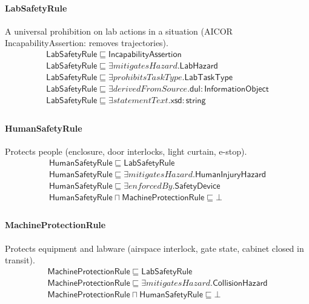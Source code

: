\documentclass[10pt]{article}
\begin{document}
\paragraph{LabSafetyRule} A universal prohibition on lab actions in a situation (AICOR IncapabilityAssertion: removes trajectories).
\[\begin{array}{l}
\mathsf{LabSafetyRule} \sqsubseteq  \mathsf{IncapabilityAssertion} \\
\mathsf{LabSafetyRule} \sqsubseteq  \exists \mathit{mitigatesHazard}.\mathsf{LabHazard} \\
\mathsf{LabSafetyRule} \sqsubseteq  \exists \mathit{prohibitsTaskType}.\mathsf{LabTaskType} \\
\mathsf{LabSafetyRule} \sqsubseteq  \exists \mathit{derivedFromSource}.\mathsf{dul{:}InformationObject} \\
\mathsf{LabSafetyRule} \sqsubseteq  \exists \mathit{statementText}.\mathsf{xsd{:}string} \\
\end{array}\]
\paragraph{HumanSafetyRule} Protects people (enclosure, door interlocks, light curtain, e-stop).
\[\begin{array}{l}
\mathsf{HumanSafetyRule} \sqsubseteq  \mathsf{LabSafetyRule} \\
\mathsf{HumanSafetyRule} \sqsubseteq  \exists \mathit{mitigatesHazard}.\mathsf{HumanInjuryHazard} \\
\mathsf{HumanSafetyRule} \sqsubseteq  \exists \mathit{enforcedBy}.\mathsf{SafetyDevice} \\
\mathsf{HumanSafetyRule} \sqcap  \mathsf{MachineProtectionRule} \sqsubseteq  \bot  \\
\end{array}\]
\paragraph{MachineProtectionRule} Protects equipment and labware (airspace interlock, gate state, cabinet closed in transit).
\[\begin{array}{l}
\mathsf{MachineProtectionRule} \sqsubseteq  \mathsf{LabSafetyRule} \\
\mathsf{MachineProtectionRule} \sqsubseteq  \exists \mathit{mitigatesHazard}.\mathsf{CollisionHazard} \\
\mathsf{MachineProtectionRule} \sqcap  \mathsf{HumanSafetyRule} \sqsubseteq  \bot  \\
\end{array}\]
\end{document}
